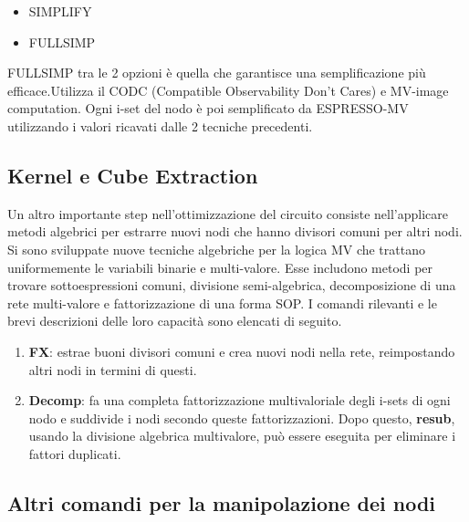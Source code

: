 \documentclass[
  italian,
]{book}
\providecommand{\tightlist}{%
  \setlength{\itemsep}{0pt}\setlength{\parskip}{0pt}}
\begin{document}
\begin{itemize}
\tightlist
\item
  SIMPLIFY
\item
  FULLSIMP
\end{itemize}

FULLSIMP tra le 2 opzioni è quella che garantisce una semplificazione più efficace.Utilizza il CODC (Compatible Observability Don't Cares) e MV-image computation. Ogni i-set del nodo è poi semplificato da ESPRESSO-MV utilizzando i valori ricavati dalle 2 tecniche precedenti.

\newpage

\hypertarget{kernel-e-cube-extraction}{%
\subsection{Kernel e Cube Extraction}\label{kernel-e-cube-extraction}}

Un altro importante step nell'ottimizzazione del circuito consiste nell'applicare metodi algebrici per estrarre nuovi nodi che hanno divisori comuni per altri nodi. Si sono sviluppate nuove tecniche algebriche per la logica MV che trattano uniformemente le variabili binarie e multi-valore. Esse includono metodi per
trovare sottoespressioni comuni, divisione semi-algebrica, decomposizione di una rete multi-valore e fattorizzazione di una forma SOP. I comandi rilevanti e le brevi descrizioni delle loro capacità sono elencati di seguito.

\begin{enumerate}
\def\labelenumi{\arabic{enumi}.}
\tightlist
\item
  \textbf{FX}: estrae buoni divisori comuni e crea nuovi nodi nella rete, reimpostando altri nodi in termini di questi.
\item
  \textbf{Decomp}: fa una completa fattorizzazione multivaloriale degli i-sets di ogni nodo e suddivide i nodi secondo queste fattorizzazioni. Dopo questo, \textbf{resub}, usando la divisione algebrica multivalore, può essere eseguita per eliminare i fattori duplicati.
\end{enumerate}

\hypertarget{altri-comandi-per-la-manipolazione-dei-nodi}{%
\subsection{Altri comandi per la manipolazione dei nodi}\label{altri-comandi-per-la-manipolazione-dei-nodi}}
\end{document}
